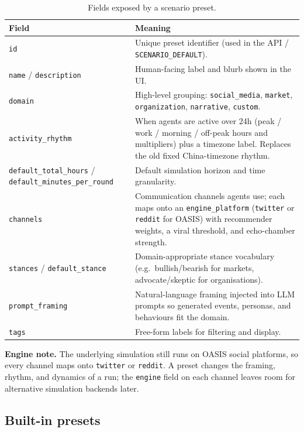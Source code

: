 \documentclass[11pt,a4paper]{article}
\begin{document}
\begin{table}[H]
\centering
\begin{tabularx}{\textwidth}{@{}l X@{}}
\toprule
\textbf{Field} & \textbf{Meaning} \\
\midrule
\texttt{id} & Unique preset identifier (used in the API / \texttt{SCENARIO\_DEFAULT}). \\
\texttt{name} / \texttt{description} & Human-facing label and blurb shown in the UI. \\
\texttt{domain} & High-level grouping: \texttt{social\_media}, \texttt{market}, \texttt{organization}, \texttt{narrative}, \texttt{custom}. \\
\texttt{activity\_rhythm} & When agents are active over 24h (peak / work / morning / off-peak hours and multipliers) plus a timezone label. Replaces the old fixed China-timezone rhythm. \\
\texttt{default\_total\_hours} / \texttt{default\_minutes\_per\_round} & Default simulation horizon and time granularity. \\
\texttt{channels} & Communication channels agents use; each maps onto an \texttt{engine\_platform} (\texttt{twitter} or \texttt{reddit} for OASIS) with recommender weights, a viral threshold, and echo-chamber strength. \\
\texttt{stances} / \texttt{default\_stance} & Domain-appropriate stance vocabulary (e.g.\ bullish/bearish for markets, advocate/skeptic for organisations). \\
\texttt{prompt\_framing} & Natural-language framing injected into LLM prompts so generated events, personas, and behaviours fit the domain. \\
\texttt{tags} & Free-form labels for filtering and display. \\
\bottomrule
\end{tabularx}
\caption{Fields exposed by a scenario preset.}
\end{table}

\textbf{Engine note.} The underlying simulation still runs on OASIS social
platforms, so every channel maps onto \texttt{twitter} or \texttt{reddit}. A
preset changes the framing, rhythm, and dynamics of a run; the \texttt{engine}
field on each channel leaves room for alternative simulation backends later.

\subsection{Built-in presets}
\end{document}
